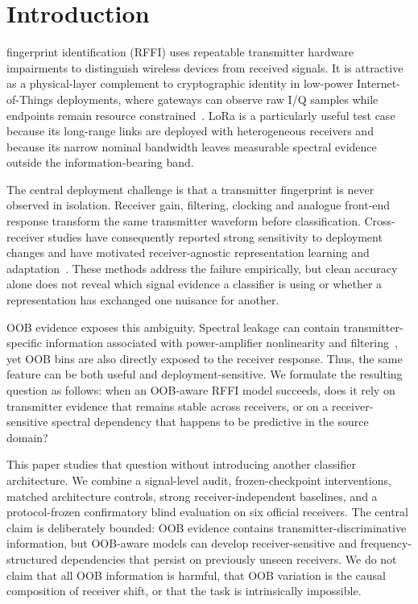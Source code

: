 \section{Introduction}
\label{sec:introduction}
 fingerprint identification (RFFI) uses repeatable transmitter hardware impairments to distinguish wireless devices from received signals. It is attractive as a physical-layer complement to cryptographic identity in low-power Internet-of-Things deployments, where gateways can observe raw I/Q samples while endpoints remain resource constrained~\cite{brik2008wireless_device_id,riyaz2018deep_cnn_radio_id,jian2020deeplearning_rf_fingerprinting}. LoRa is a particularly useful test case because its long-range links are deployed with heterogeneous receivers and because its narrow nominal bandwidth leaves measurable spectral evidence outside the information-bearing band.

The central deployment challenge is that a transmitter fingerprint is never observed in isolation. Receiver gain, filtering, clocking and analogue front-end response transform the same transmitter waveform before classification. Cross-receiver studies have consequently reported strong sensitivity to deployment changes and have motivated receiver-agnostic representation learning and adaptation~\cite{elmaghbub2021lora_wild,hamdaoui2022deeplearning,shen2024receiveragnostic,ma2025receiver_independent_rffi}. These methods address the failure empirically, but clean accuracy alone does not reveal which signal evidence a classifier is using or whether a representation has exchanged one nuisance for another.

OOB evidence exposes this ambiguity. Spectral leakage can contain transmitter-specific information associated with power-amplifier nonlinearity and filtering~\cite{elmaghbub2020widescan,zhou2021robust_rffi_iotj}, yet OOB bins are also directly exposed to the receiver response. Thus, the same feature can be both useful and deployment-sensitive. We formulate the resulting question as follows: when an OOB-aware RFFI model succeeds, does it rely on transmitter evidence that remains stable across receivers, or on a receiver-sensitive spectral dependency that happens to be predictive in the source domain?

This paper studies that question without introducing another classifier architecture. We combine a signal-level audit, frozen-checkpoint interventions, matched architecture controls, strong receiver-independent baselines, and a protocol-frozen confirmatory blind evaluation on six official receivers. The central claim is deliberately bounded: OOB evidence contains transmitter-discriminative information, but OOB-aware models can develop receiver-sensitive and frequency-structured dependencies that persist on previously unseen receivers. We do not claim that all OOB information is harmful, that OOB variation is the causal composition of receiver shift, or that the task is intrinsically impossible.

